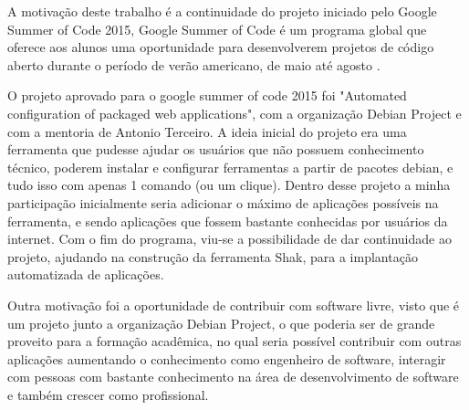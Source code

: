 A motivação deste trabalho é a continuidade do projeto iniciado pelo Google Summer
of Code 2015, Google Summer of Code é um programa global que oferece aos
alunos uma oportunidade para desenvolverem projetos de código aberto durante o período
de verão americano, de maio até agosto \cite{gsoc2015}.

O projeto aprovado para o google summer of code 2015 foi "Automated configuration
of packaged web applications", com a organização Debian Project e com a mentoria de
Antonio Terceiro. A ideia inicial do projeto era uma ferramenta que
pudesse ajudar os usuários que não possuem conhecimento técnico, poderem
instalar e configurar ferramentas a partir de pacotes debian, e tudo isso com
apenas 1 comando (ou um clique). Dentro desse projeto a minha participação
inicialmente seria adicionar o máximo de aplicações possíveis na ferramenta,
e sendo aplicações que fossem bastante conhecidas por usuários da internet. Com o
 fim do programa, viu-se a possibilidade de dar continuidade ao projeto, ajudando
na construção da ferramenta Shak, para a implantação automatizada de aplicações.

Outra motivação foi a oportunidade de contribuir com software livre, visto que é
um projeto junto a organização Debian Project, o que poderia ser de grande proveito
para a formação acadêmica, no qual seria possível contribuir com outras
aplicações aumentando o conhecimento como engenheiro de software, interagir com
pessoas com bastante conhecimento na área de desenvolvimento de software e também
crescer como profissional.
